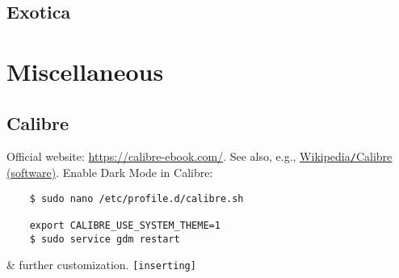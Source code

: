 \documentclass[oneside]{book}
\numberwithin{equation}{section}
\begin{document}
\section{Exotica}


\chapter{Miscellaneous}

\section{Calibre}
Official website: \url{https://calibre-ebook.com/}. See also, e.g., \href{https://en.wikipedia.org/wiki/Calibre_(software)}{Wikipedia\texttt{/}Calibre (software)}. Enable Dark Mode in Calibre:
\begin{verbatim}
	$ sudo nano /etc/profile.d/calibre.sh
	
	export CALIBRE_USE_SYSTEM_THEME=1
	$ sudo service gdm restart
\end{verbatim}
\& further customization. \texttt{[inserting]}


\printbibliography[heading=bibintoc]
	
\end{document}
